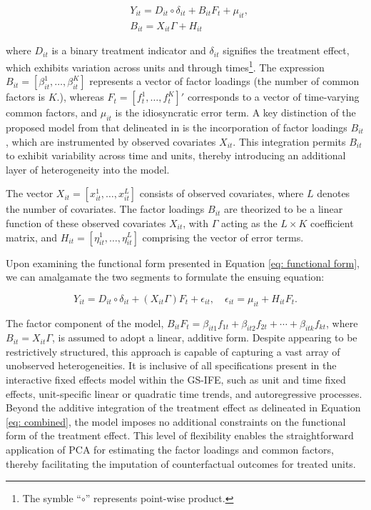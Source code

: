 \documentclass[12pt]{article}
\begin{document}
\begin{equation}
\begin{aligned}
& Y_{it} = D_{it} \circ \delta_{it} + B_{it}F_{t} + \mu_{it}, \\
& B_{it} = X_{it}\Gamma + H_{it}
\end{aligned}
\label{eq: functional form}
\end{equation}

\noindent where $D_{it}$ is a binary treatment indicator and $\delta_{it}$ signifies the treatment effect, which exhibits variation across units and through times\footnote{The symble ``$\circ$'' represents point-wise product.}. The expression $B_{it} = [\beta_{it}^1, \ldots, \beta_{it}^K]$ represents a vector of factor loadings (the number of common factors is $K$.), whereas $F_{t} = [f_{t}^1, \ldots, f_{t}^K]'$ corresponds to a vector of time-varying common factors, and $\mu_{it}$ is the idiosyncratic error term. A key distinction of the proposed model from that delineated in \cite{xu2017generalized} is the incorporation of factor loadings $B_{it}$, which are instrumented by observed covariates $X_{it}$. This integration permits $B_{it}$ to exhibit variability across time and units, thereby introducing an additional layer of heterogeneity into the model.

The vector $X_{it} = [x_{it}^1, \ldots, x_{it}^L]$ consists of observed covariates, where $L$ denotes the number of covariates. The factor loadings $B_{it}$ are theorized to be a linear function of these observed covariates $X_{it}$, with $\Gamma$ acting as the $L\times K$ coefficient matrix, and $H_{it} = [\eta_{it}^1, \ldots, \eta_{it}^L]$ comprising the vector of error terms.

Upon examining the functional form presented in Equation \ref{eq: functional form}, we can amalgamate the two segments to formulate the ensuing equation:


\begin{equation}
Y_{it} = D_{it} \circ \delta_{it} + (X_{it}\Gamma) F_{t} + \epsilon_{it}, \quad \epsilon_{it} = \mu_{it} + H_{it}F_t.
\label{eq: combined}
\end{equation}

The factor component of the model, $B_{it}F_{t} = \beta_{it1}f_{1t} + \beta_{it2}f_{2t} + \cdots + \beta_{itk}f_{kt}$, where $B_{it} = X_{it}\Gamma$, is assumed to adopt a linear, additive form. Despite appearing to be restrictively structured, this approach is capable of capturing a vast array of unobserved heterogeneities. It is inclusive of all specifications present in the interactive fixed effects model within the GS-IFE, such as unit and time fixed effects, unit-specific linear or quadratic time trends, and autoregressive processes. Beyond the additive integration of the treatment effect as delineated in Equation \ref{eq: combined}, the model imposes no additional constraints on the functional form of the treatment effect. This level of flexibility enables the straightforward application of PCA for estimating the factor loadings and common factors, thereby facilitating the imputation of counterfactual outcomes for treated units.
\end{document}
